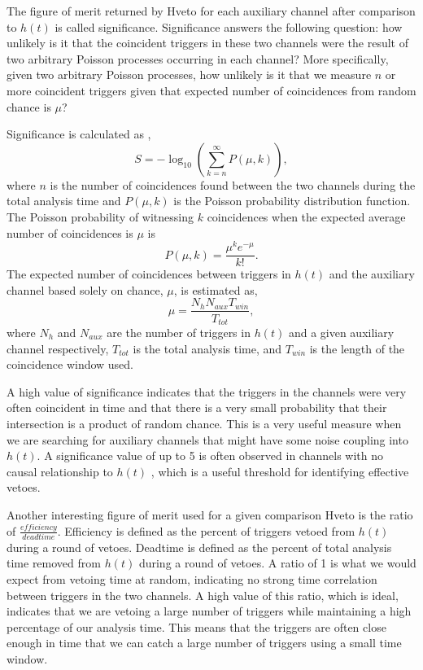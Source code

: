 The figure of merit returned by Hveto for each auxiliary channel 
after comparison to $h(t)$ is called significance.
Significance answers the following question: how unlikely is it that 
the coincident triggers in these two channels were the result of 
two arbitrary Poisson processes occurring in each channel? 
More specifically, given two arbitrary Poisson processes, how 
unlikely is it that we measure $n$ or more coincident triggers 
given that expected number of coincidences from random chance is $\mu$?

Significance is calculated as \cite{Smith:2011},
\begin{equation}
S = -\log_{10} (\sum\limits_{k = n}^{\infty} P(\mu,k)),
\end{equation}
where $n$ is the number of coincidences found between the two channels 
during the total analysis time and $P(\mu,k)$ is the Poisson probability 
distribution function. The Poisson probability of witnessing $k$ 
coincidences when the expected average number of coincidences is $\mu$ is 
\begin{equation}
P(\mu,k) = \frac{\mu^{k}e^{-\mu}}{k!}.
\end{equation}
The expected number of coincidences between triggers in 
$h(t)$ and the auxiliary channel based solely on chance, $\mu$, is estimated as,
\begin{equation}
\mu = \frac{N_{h}N_{aux}T_{win}}{T_{tot}},
\end{equation}
where $N_{h}$ and $N_{aux}$ are the number of triggers in $h(t)$ and a 
given auxiliary channel respectively, 
$T_{tot}$ is the total analysis time, and $T_{win}$ is the length of the 
coincidence window used.

A high value of significance indicates that the triggers in the channels 
were very often coincident in time and that there is a very small probability 
that their intersection is a product of random chance. This is a very useful 
measure when we are searching for auxiliary channels that might have some 
noise coupling into $h(t)$. A significance value of up to 5 is 
often observed in channels with no causal relationship to $h(t)$ \cite{Smith:2011}, 
which is a useful threshold for identifying effective vetoes.

Another interesting figure of merit used for a given comparison Hveto is 
the ratio of $\frac{efficiency}{deadtime}$. Efficiency is defined as the 
percent of triggers vetoed from $h(t)$ during a round of vetoes. Deadtime 
is defined as the percent of total analysis time removed from $h(t)$ during 
a round of vetoes. A ratio of 1 is what we would expect from vetoing time 
at random, indicating no strong time correlation between triggers in the 
two channels. A high value of this ratio, which is ideal, indicates that 
we are vetoing a large number of triggers while maintaining a high percentage 
of our analysis time. This means that the triggers are often close enough 
in time that we can catch a large number of triggers using a small time window.


